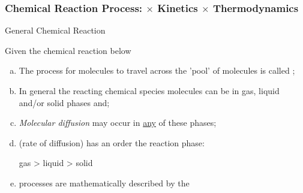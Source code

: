 \documentclass[10pt,compress,handout,unknownkeysallowed]{beamer}
\begin{document}
\begin{frame}
  \frametitle{Chemical Reaction Process:  $\times$ Kinetics $\times$ Thermodynamics}

  \begin{block}{\begin{center}General Chemical Reaction\end{center}}
     Given the chemical reaction below
  \end{block}  

   \begin{enumerate}[a)]
       \item<1-> The process for molecules to travel across the 'pool' of molecules is called ;
       \item<2-> In general the reacting chemical species molecules can be in gas, liquid and/or solid phases and;
       \item<2-> {\it Molecular diffusion} may occur in \underline{any} of these phases;
       \item<3->  (\ie rate of diffusion) has an order \wrt the reaction phase:
               \begin{center} gas > liquid > solid\end{center}
       \item<3->  processes are mathematically described by the 
   \end{enumerate}
\end{frame}
\normalsize
\end{document}
